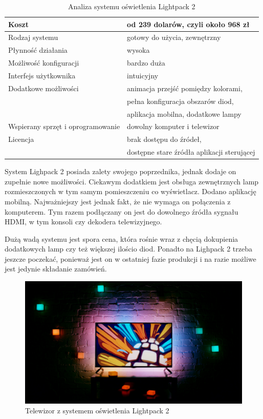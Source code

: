 \documentclass[12pt]{report}
\begin{document}
\begin{table}[h]
\centering
\begin{tabular}{| l | l |} 
\hline 
Koszt & od 239 dolarów, czyli około 968 zł \\ \hline
Rodzaj systemu & gotowy do użycia, zewnętrzny \\ \hline
Płynność działania & wysoka \\ \hline
Możliwość konfiguracji & bardzo duża  \\ \hline
Interfejs użytkownika & intuicyjny  \\ \hline
Dodatkowe możliwości &  animacja przejść pomiędzy kolorami, \\ \hline
& pełna konfiguracja obszarów diod, \\ \hline
& aplikacja mobilna, dodatkowe lampy \\ \hline
Wspierany sprzęt i oprogramowanie &  dowolny komputer i telewizor   \\ \hline
Licencja & brak dostępu do źródeł,  \\ \hline
& dostępne stare źródła aplikacji sterującej \\ \hline
\end{tabular} 
\caption{Analiza systemu oświetlenia Lightpack 2}
\end{table}

System Lighpack 2 posiada zalety swojego poprzednika, jednak dodaje on zupełnie nowe możliwości. Ciekawym dodatkiem jest obsługa zewnętrznych lamp rozmieszczonych w tym samym pomieszczeniu co wyświetlacz. Dodano aplikację mobilną. Najważniejszy jest jednak fakt, że nie wymaga on połączenia z komputerem. Tym razem podłączany on jest do dowolnego źródła sygnału HDMI, w tym konsoli czy dekodera telewizyjnego.

Dużą wadą systemu jest spora cena, która rośnie wraz z chęcią dokupienia dodatkowych lamp czy też większej ilościo diod. Ponadto na Lighpack 2 trzeba jeszcze poczekać, ponieważ jest on w ostatniej fazie produkcji i na razie możliwe jest jedynie składanie zamówień.

\begin{figure}[h]
\centering
\includegraphics[width=\textwidth]{../resources/lightpack2m.jpg}
\caption[Telewizor z systemem oświetlenia Lightpack 2]{Telewizor z systemem oświetlenia Lightpack 2 \cite{lp2s}}
\end{figure}
\end{document}

